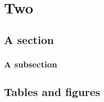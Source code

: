 \chapter{Two}
\section{A section}
\lipsum \cite{Chomsky1986,Chomsky1995,Munn2000}
\subsection{A subsection}
\lipsum



\begin{appendix}
\chapter{Tables and figures}
\end{appendix}
